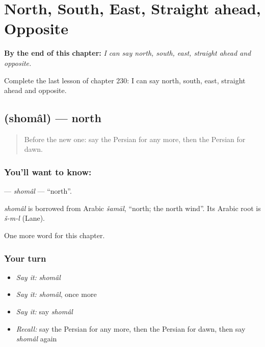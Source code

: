 
\chapter{North, South, East, Straight ahead, Opposite}
\label{ch:fa-north-south-east-straight-ahead-opposite}

\begin{chapteropening}
\textbf{By the end of this chapter:} \emph{I can say north, south, east, straight ahead and opposite.}

Complete the last lesson of chapter 230: I can say north, south, east, straight ahead and opposite.
\end{chapteropening}

\section[\texorpdfstring{\fa{شمال} (shomâl)}{شمال (shomâl)}]{ (shomâl) — north}

\label{lesson:FA-C230-shomal}



\begin{quote}
Before the new one: say the Persian for any more, then the Persian for dawn.
\end{quote}

\subsection*{You'll want to know: }
\textbf{} — \emph{shomâl} — \textquotedblleft{}north\textquotedblright{}.

\begin{cousinweb}
\emph{shomâl} is borrowed from Arabic \emph{šamāl}, \textquotedblleft{}north; the north wind\textquotedblright{}. Its Arabic root is \emph{š-m-l} (Lane).
\end{cousinweb}

\begin{grammarlens}[title={What you've built}]
One more word for this chapter.
\end{grammarlens}

\subsection*{Your turn}
\begin{itemize}
\raggedright
  \item \emph{Say it:} \emph{shomâl}
  \item \emph{Say it:} \emph{shomâl}, once more
  \item \emph{Say it:} say \emph{shomâl}
  \item \emph{Recall:} say the Persian for any more, then the Persian for dawn, then say \emph{shomâl} again
\end{itemize}

